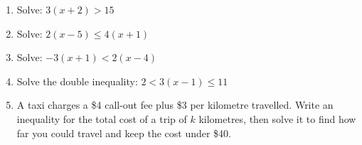 \documentclass[11pt]{article}
\newcommand{\ans}{\hrulefill}
\newcommand{\anshere}{\par\vspace{0.2em}\noindent\ans\par\vspace{0.2em}}
\begin{document}
\vspace{0.4em}
\begin{enumerate}[label=(\alph*)]
  \item Solve: \quad $3(x+2) > 15$
  \anshere
  \item Solve: \quad $2(x-5) \le 4(x+1)$
  \anshere
  \item Solve: \quad $-3(x+1) < 2(x-4)$
  \anshere
  \item Solve the double inequality: \quad $2 < 3(x-1) \le 11$
  \anshere
  \item A taxi charges a \$4 call-out fee plus \$3 per kilometre travelled. Write an
    inequality for the total cost of a trip of $k$ kilometres, then solve it to find
    how far you could travel and keep the cost under \$40.
  \anshere
\end{enumerate}
\end{document}
